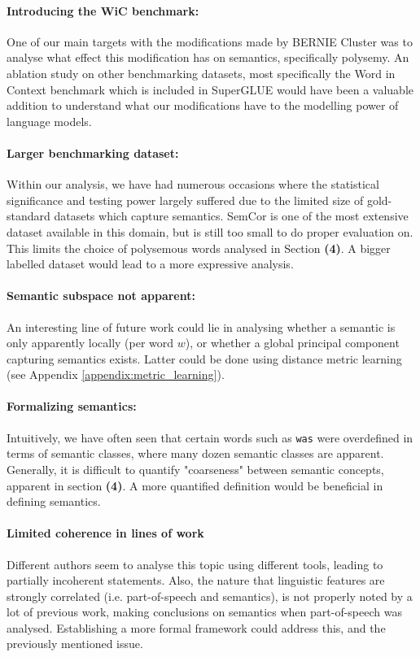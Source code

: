 \documentclass[a4paper,12pt,oneside,openright]{report}
\begin{document}
\paragraph{Introducing the WiC benchmark:} One of our main targets with the modifications made by BERNIE Cluster was to analyse what effect this modification has on semantics, specifically polysemy.
An ablation study on other benchmarking datasets, most specifically the Word in Context benchmark which is included in SuperGLUE would have been a valuable addition to understand what our modifications have to the modelling power of language models.

\paragraph{Larger benchmarking dataset:} Within our analysis, we have had numerous occasions where the statistical significance and testing power largely suffered due to the limited size of gold-standard datasets which capture semantics.
SemCor is one of the most extensive dataset available in this domain, but is still too small to do proper evaluation on.
This limits the choice of polysemous words analysed in Section \textbf{(4)}.
A bigger labelled dataset would lead to a more expressive analysis.

\paragraph{Semantic subspace not apparent:} An interesting line of future work could lie in analysing whether a semantic is only apparently locally (per word $w$), or whether a global principal component capturing semantics exists.
Latter could be done using distance metric learning (see Appendix \ref{appendix:metric_learning}).

\paragraph{Formalizing semantics:}
Intuitively, we have often seen that certain words such as \texttt{was} were overdefined in terms of semantic classes, where many dozen semantic classes are apparent.
Generally, it is difficult to quantify "coarseness" between semantic concepts, apparent in section \textbf{(4)}.
A more quantified definition would be beneficial in defining semantics.

\paragraph{Limited coherence in lines of work} 
Different authors seem to analyse this topic using different tools, leading to partially incoherent statements.
Also, the nature that linguistic features are strongly correlated (i.e. part-of-speech and semantics), is not properly noted by a lot of previous work, making conclusions on semantics when part-of-speech was analysed.
Establishing a more formal framework could address this, and the previously mentioned issue.
\end{document}
